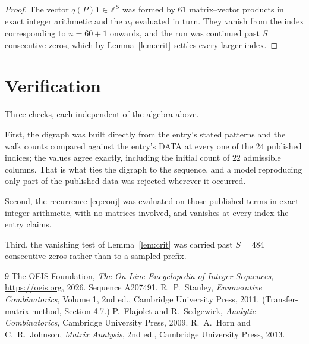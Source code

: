 \documentclass[11pt,a4paper]{article}
\theoremstyle{plain}
\theoremstyle{definition}
\begin{document}
\begin{proof}
The vector $q(P)\mathbf{1}\in\mathbb{Z}^{S}$ was formed by $61$ matrix--vector
products in exact integer arithmetic and the $u_j$ evaluated in turn. They vanish from the
index corresponding to $n=60+1$ onwards, and the run was continued past $S$ consecutive
zeros, which by Lemma~\ref{lem:crit} settles every larger index.
\end{proof}

\section{Verification}

Three checks, each independent of the algebra above.

First, the digraph was built directly from the entry's stated patterns and the walk counts
compared against the entry's DATA at every one of the $24$ published indices; the
values agree exactly, including the initial count of $22$ admissible columns. That is
what ties the digraph to the sequence, and a model reproducing only part of the published
data was rejected wherever it occurred.

Second, the recurrence \eqref{eq:conj} was evaluated on those published terms in exact
integer arithmetic, with no matrices involved, and vanishes at every index the entry claims.

Third, the vanishing test of Lemma~\ref{lem:crit} was carried past $S=484$ consecutive
zeros rather than to a sampled prefix.

\begin{thebibliography}{9}
 The OEIS Foundation, \emph{The On-Line Encyclopedia of Integer
Sequences}, \url{https://oeis.org}, 2026. Sequence A207491.
 R.~P.~Stanley, \emph{Enumerative Combinatorics}, Volume 1, 2nd ed.,
Cambridge University Press, 2011. (Transfer-matrix method, Section 4.7.)
 P.~Flajolet and R.~Sedgewick, \emph{Analytic Combinatorics}, Cambridge
University Press, 2009.
 R.~A.~Horn and C.~R.~Johnson, \emph{Matrix Analysis}, 2nd ed., Cambridge
University Press, 2013.
\end{thebibliography}
\end{document}
